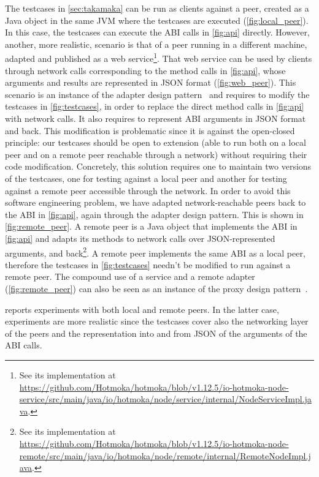 The testcases in \cref{sec:takamaka} can be run as clients against a peer, created
as a Java object in the same JVM where the testcases are executed
(\cref{fig:local_peer}). In this case, the testcases can execute the ABI
calls in \cref{fig:api} directly. However, another, more realistic, scenario is that
of a peer running in a different machine, adapted and published as a web service\footnote{See its implementation at \url{https://github.com/Hotmoka/hotmoka/blob/v1.12.5/io-hotmoka-node-service/src/main/java/io/hotmoka/node/service/internal/NodeServiceImpl.java}.}.
That web service can be used by clients through network calls corresponding to
the method calls in \cref{fig:api}, whose arguments and results
are represented in JSON format (\cref{fig:web_peer}). This scenario
is an instance of the adapter design pattern~\citep{GammaHJV95} and requires to
modify the testcases in \cref{fig:testcases}, in order to replace the direct method
calls in \cref{fig:api} with network calls. It also requires to represent ABI arguments
in JSON format and back. This modification is problematic since it is against
the open-closed principle: our testcases should be open to extension
(\ieinitial able to run both on a local peer and on a remote peer reachable through a network)
without requiring their
code modification. Concretely, this solution requires one to maintain two versions of the testcases,
one for testing against a local peer and another for testing against a remote peer
accessible through the network.
In order to avoid this software engineering problem, we have adapted
network-reachable peers back to the ABI in \cref{fig:api}, again through the adapter
design pattern. This is shown in \cref{fig:remote_peer}. A remote peer
is a Java object that implements the ABI in \cref{fig:api} and adapts
its methods to network calls over JSON-represented arguments, and back\footnote{See its implementation at \url{https://github.com/Hotmoka/hotmoka/blob/v1.12.5/io-hotmoka-node-remote/src/main/java/io/hotmoka/node/remote/internal/RemoteNodeImpl.java}.}.
A remote peer implements the same ABI as a local peer, therefore the testcases
in \cref{fig:testcases} needn't be modified to run against a remote peer.
The compound use of a service and a remote adapter (\cref{fig:remote_peer}) can also
be seen as an instance of the proxy design pattern~\citep{GammaHJV95}.

 reports experiments with both local and remote peers.
In the latter case, experiments are more realistic since the testcases
cover also the networking layer of the peers and the representation into and from JSON
of the arguments of the ABI calls.
